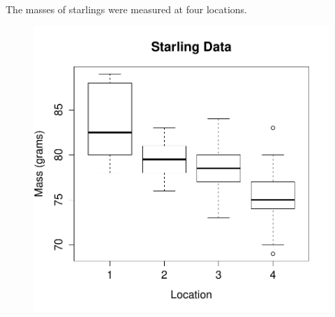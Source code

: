The masses of starlings were measured at four locations.

\begin{figure}[ht!]
\begin{center}
\includegraphics[scale=0.6]{Figures/starling.pdf}
\end{center}
\end{figure}



